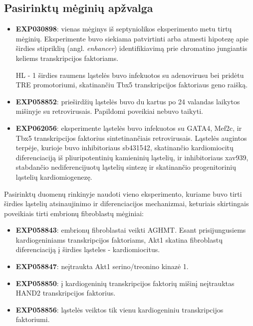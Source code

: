 \documentclass[12pt]{article}
\begin{document}
\subsection{Pasirinktų mėginių apžvalga}
\begin{itemize}
    \item \textbf{EXP030898}: vienas mėginys iš septyniolikos eksperimento
        metu tirtų mėginių. Eksperimente buvo siekiama patvirtinti arba
        atmesti hipotezę apie širdies stipriklių (angl. \emph{enhancer})
        identifikiavimą prie chromatino jungiantis keliems transkripcijos
        faktoriams.

        HL - 1 širdies raumens ląstelės buvo infekuotos su adenovirusu
        bei pridėtu TRE promotoriumi, skatinančiu Tbx5 transkripcijos
        faktoriaus geno raišką.
    \item \textbf{EXP058852}: prieširdžių ląstelės buvo du kartus po 24
        valandas laikytos mišinyje su retrovirusais. Papildomi poveikiai nebuvo
        taikyti.
    \item \textbf{EXP062056}: eksperimente ląstelės buvo infekuotos su GATA4,
        Mef2c, ir Tbx5 transkripcijos faktorius sintetinančiais retrovirusais.
        Ląstelės augintos terpėje, kurioje buvo inhibitoriaus sb431542,
        skatinančio kardiomiocitų diferenciaciją iš pliuripotentinių
        kamieninių ląstelių, ir inhibitoriaus xav939, stabdančio
        nediferencijuotų ląstelių sintezę ir skatinančio progenitorinių
        ląstelių kardiomiogenezę.
\end{itemize}

Pasirinktų duomenų rinkinyje naudoti vieno eksperimento, kuriame buvo tirti
širdies ląstelių atsinaujinimo ir diferenciacijos mechanizmai, keturiais
skirtingais poveikiais tirti embrionų fibroblastų mėginiai:

\begin{itemize}
    \item \textbf{EXP058843}: embrionų fibroblastai veikti AGHMT. Esant
        prisijungusiems kardiogeniniams transkripcijos faktoriams, Akt1
        skatina fibroblastų diferenciaciją į širdies ląsteles - kardiomiocitus.
    \item \textbf{EXP058847}: neįtraukta Akt1 serino/treonino kinazė 1.
    \item \textbf{EXP058850}: į kardiogeninių transkripcijos faktorių mišinį
        neįtrauktas HAND2 transkripcijos faktorius.
    \item \textbf{EXP058856}: ląstelės veiktos tik vienu kardiogeniniu 
        transkripcijos faktoriumi.
  \end{itemize}
\newpage
\end{document}
